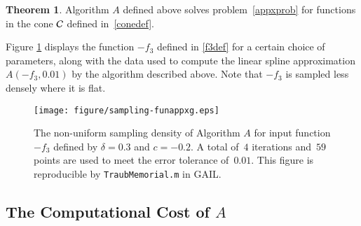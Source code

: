 \documentclass[review]{elsarticle}
\theoremstyle{definition}
\newtheorem{theorem}{Theorem}
\begin{document}
\begin{theorem} \label{thm:algAworks}
Algorithm $A$ defined above solves problem~\eqref{appxprob} for functions in the
cone $\mathcal{C}$ defined in~\eqref{conedef}.
\end{theorem}

Figure \ref{fig:sampling-funappxg} displays the function $-f_3$ defined in
\eqref{f3def} for a certain choice of parameters, along with the data used to
compute the linear spline approximation $A(-f_3,0.01)$ by the algorithm
described above. Note that $-f_3$ is sampled less densely where it is flat.

\begin{figure}[tbh]
\centering
\texttt{[image: figure/sampling-funappxg.eps]}
\caption{The non-uniform sampling density of Algorithm $A$ for input function
$-f_3$ defined by $\delta = 0.3$ and $c = -0.2$. A total of~$4$ iterations
and~$59$ points are used to meet the error tolerance of~$0.01$. This figure is
reproducible by {\tt TraubMemorial.m} in GAIL.}
\label{fig:sampling-funappxg}
\end{figure}


\subsection{The Computational Cost of $A$} \label{subsec:appxcost}
\end{document}
